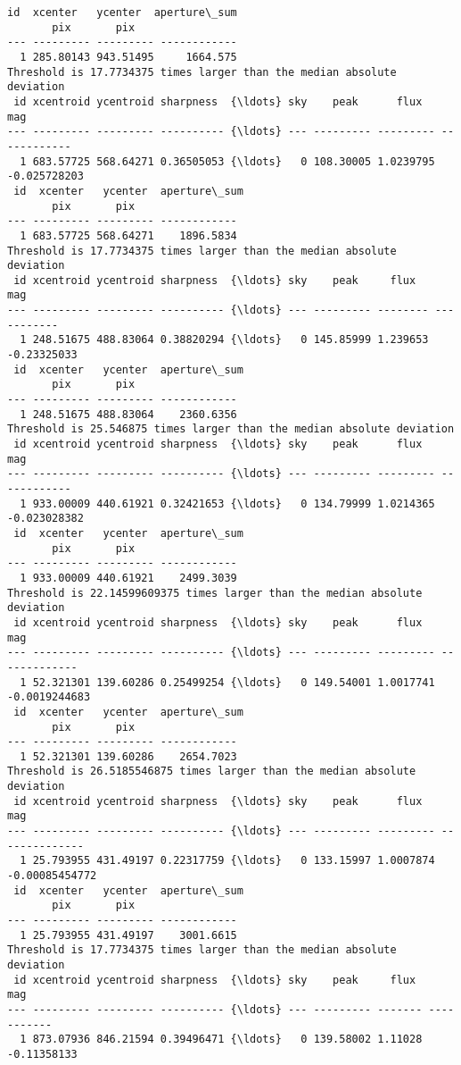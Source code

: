 \documentclass[11pt]{article}
\begin{document}
\begin{Verbatim}[commandchars=\\\{\}]
 id  xcenter   ycenter  aperture\_sum
       pix       pix
--- --------- --------- ------------
  1 285.80143 943.51495     1664.575
Threshold is 17.7734375 times larger than the median absolute deviation
 id xcentroid ycentroid sharpness  {\ldots} sky    peak      flux       mag
--- --------- --------- ---------- {\ldots} --- --------- --------- ------------
  1 683.57725 568.64271 0.36505053 {\ldots}   0 108.30005 1.0239795 -0.025728203
 id  xcenter   ycenter  aperture\_sum
       pix       pix
--- --------- --------- ------------
  1 683.57725 568.64271    1896.5834
Threshold is 17.7734375 times larger than the median absolute deviation
 id xcentroid ycentroid sharpness  {\ldots} sky    peak     flux       mag
--- --------- --------- ---------- {\ldots} --- --------- -------- -----------
  1 248.51675 488.83064 0.38820294 {\ldots}   0 145.85999 1.239653 -0.23325033
 id  xcenter   ycenter  aperture\_sum
       pix       pix
--- --------- --------- ------------
  1 248.51675 488.83064    2360.6356
Threshold is 25.546875 times larger than the median absolute deviation
 id xcentroid ycentroid sharpness  {\ldots} sky    peak      flux       mag
--- --------- --------- ---------- {\ldots} --- --------- --------- ------------
  1 933.00009 440.61921 0.32421653 {\ldots}   0 134.79999 1.0214365 -0.023028382
 id  xcenter   ycenter  aperture\_sum
       pix       pix
--- --------- --------- ------------
  1 933.00009 440.61921    2499.3039
Threshold is 22.14599609375 times larger than the median absolute deviation
 id xcentroid ycentroid sharpness  {\ldots} sky    peak      flux        mag
--- --------- --------- ---------- {\ldots} --- --------- --------- -------------
  1 52.321301 139.60286 0.25499254 {\ldots}   0 149.54001 1.0017741 -0.0019244683
 id  xcenter   ycenter  aperture\_sum
       pix       pix
--- --------- --------- ------------
  1 52.321301 139.60286    2654.7023
Threshold is 26.5185546875 times larger than the median absolute deviation
 id xcentroid ycentroid sharpness  {\ldots} sky    peak      flux        mag
--- --------- --------- ---------- {\ldots} --- --------- --------- --------------
  1 25.793955 431.49197 0.22317759 {\ldots}   0 133.15997 1.0007874 -0.00085454772
 id  xcenter   ycenter  aperture\_sum
       pix       pix
--- --------- --------- ------------
  1 25.793955 431.49197    3001.6615
Threshold is 17.7734375 times larger than the median absolute deviation
 id xcentroid ycentroid sharpness  {\ldots} sky    peak     flux      mag
--- --------- --------- ---------- {\ldots} --- --------- ------- -----------
  1 873.07936 846.21594 0.39496471 {\ldots}   0 139.58002 1.11028 -0.11358133

\end{Verbatim}
\end{document}
